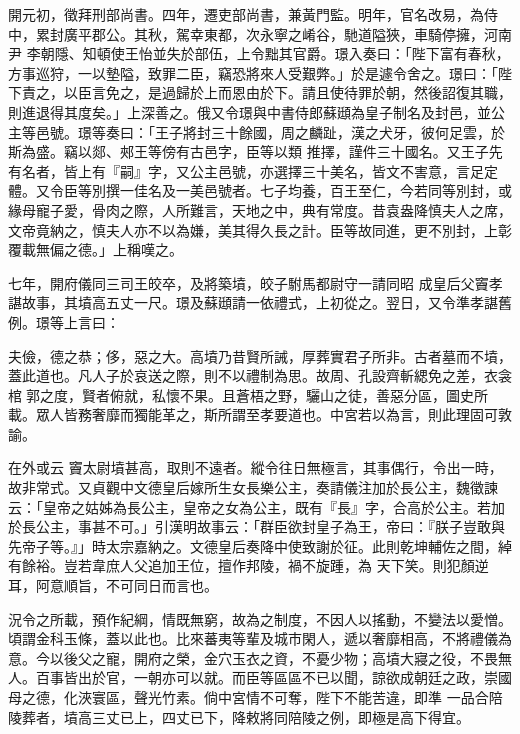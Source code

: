 \begin{pinyinscope}
 開元初，徵拜刑部尚書。四年，遷吏部尚書，兼黃門監。明年，官名改易，為侍中，累封廣平郡公。其秋，駕幸東都，次永寧之崤谷，馳道隘狹，車騎停擁，河南尹
 李朝隱、知頓使王怡並失於部伍，上令黜其官爵。璟入奏曰：「陛下富有春秋，方事巡狩，一以墊隘，致罪二臣，竊恐將來人受艱弊。」於是遽令舍之。璟曰：「陛下責之，以臣言免之，是過歸於上而恩由於下。請且使待罪於朝，然後詔復其職，則進退得其度矣。」上深善之。俄又令璟與中書侍郎蘇頲為皇子制名及封邑，並公主等邑號。璟等奏曰：「王子將封三十餘國，周之麟趾，漢之犬牙，彼何足雲，於斯為盛。竊以郯、郟王等傍有古邑字，臣等以類
 推擇，謹件三十國名。又王子先有名者，皆上有『嗣』字，又公主邑號，亦選擇三十美名，皆文不害意，言足定體。又令臣等別撰一佳名及一美邑號者。七子均養，百王至仁，今若同等別封，或緣母寵子愛，骨肉之際，人所難言，天地之中，典有常度。昔袁盎降慎夫人之席，文帝竟納之，慎夫人亦不以為嫌，美其得久長之計。臣等故同進，更不別封，上彰覆載無偏之德。」上稱嘆之。



 七年，開府儀同三司王皎卒，及將築墳，皎子駙馬都尉守一請同昭
 成皇后父竇孝諶故事，其墳高五丈一尺。璟及蘇頲請一依禮式，上初從之。翌日，又令準孝諶舊例。璟等上言曰：



 夫儉，德之恭；侈，惡之大。高墳乃昔賢所誡，厚葬實君子所非。古者墓而不墳，蓋此道也。凡人子於哀送之際，則不以禮制為思。故周、孔設齊斬緦免之差，衣衾棺郭之度，賢者俯就，私懷不果。且蒼梧之野，驪山之徒，善惡分區，圖史所載。眾人皆務奢靡而獨能革之，斯所謂至孝要道也。中宮若以為言，則此理固可敦諭。



 在外或云
 竇太尉墳甚高，取則不遠者。縱令往日無極言，其事偶行，令出一時，故非常式。又貞觀中文德皇后嫁所生女長樂公主，奏請儀注加於長公主，魏徵諫云：「皇帝之姑姊為長公主，皇帝之女為公主，既有『長』字，合高於公主。若加於長公主，事甚不可。」引漢明故事云：「群臣欲封皇子為王，帝曰：『朕子豈敢與先帝子等。』」時太宗嘉納之。文德皇后奏降中使致謝於征。此則乾坤輔佐之間，綽有餘裕。豈若韋庶人父追加王位，擅作邦陵，禍不旋踵，為
 天下笑。則犯顏逆耳，阿意順旨，不可同日而言也。



 況令之所載，預作紀綱，情既無窮，故為之制度，不因人以搖動，不變法以愛憎。頃謂金科玉條，蓋以此也。比來蕃夷等輩及城市閑人，遞以奢靡相高，不將禮儀為意。今以後父之寵，開府之榮，金穴玉衣之資，不憂少物；高墳大寢之役，不畏無人。百事皆出於官，一朝亦可以就。而臣等區區不已以聞，諒欲成朝廷之政，崇國母之德，化浹寰區，聲光竹素。倘中宮情不可奪，陛下不能苦違，即準
 一品合陪陵葬者，墳高三丈已上，四丈已下，降敕將同陪陵之例，即極是高下得宜。




\end{pinyinscope}
